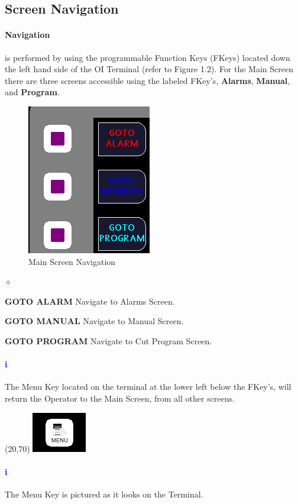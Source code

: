 \subsection{Screen Navigation}\paragraph{Navigation}is performed by using the programmable Function Keys (FKeys) located down the left hand side of the OI Terminal (refer to Figure 1.2). For the Main Screen there are three screens accessible using the labeled FKey's, \textbf{Alarms}, \textbf{Manual}, and \textbf{Program}.
\begin{figure}
		\centering
		\includegraphics[width=.3\linewidth]{screen-captures/main/main-nav}
		\caption{Main Screen Navigation}
		\label{fig:main-nav}
\end{figure}
\begin{list}{$\diamond$}{}
	\item \textbf{GOTO ALARM} Navigate to Alarms Screen.
	\item \textbf{GOTO MANUAL} Navigate to Manual Screen.
	\item \textbf{GOTO PROGRAM} Navigate to Cut Program Screen.
\end{list}
\paragraph{\textbf{\LARGE \textcolor{blue}{i}}}
The Menu Key located on the terminal at the lower left below the FKey's, will return the Operator to the Main Screen, from all other screens.\\
\begin{minipage}{4cm}
	\begin{picture}(20,70)
	\includegraphics[width=.5\linewidth]{screen-captures/menu}
	\end{picture}
\end{minipage}\begin{minipage}[]{11cm}
\paragraph{\textbf{\LARGE \textcolor{blue}{i}}} The Menu Key is pictured as it looks on the Terminal.
\end{minipage}
\pagebreak
